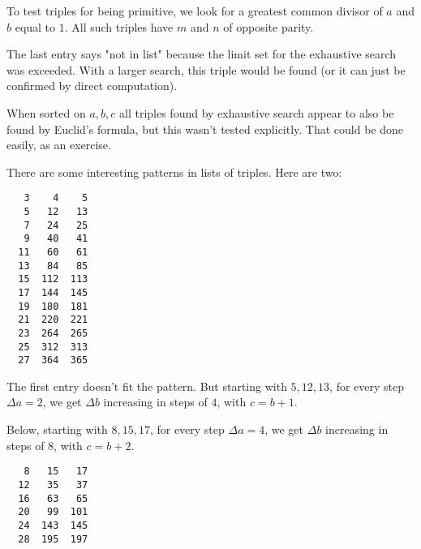 \documentclass[11pt, oneside]{article}
\begin{document}
To test triples for being primitive, we look for a greatest common divisor of $a$ and $b$ equal to $1$.  All such triples have $m$ and $n$ of opposite parity.

The last entry says "not in list" because the limit set for the exhaustive search was exceeded.  With a larger search, this triple would be found (or it can just be confirmed by direct computation).

When sorted on $a,b,c$ all triples found by exhaustive search appear to also be found by Euclid's formula, but this wasn't tested explicitly.  That could be done easily, as an exercise.

There are some interesting patterns in lists of triples.  Here are two:

\begin{verbatim}
   3    4    5 
   5   12   13 
   7   24   25 
   9   40   41 
  11   60   61 
  13   84   85 
  15  112  113 
  17  144  145 
  19  180  181 
  21  220  221 
  23  264  265 
  25  312  313 
  27  364  365 
\end{verbatim}

The first entry doesn't fit the pattern.  But starting with $5,12,13$, for every step $\Delta a = 2$, we get $\Delta b$ increasing in steps of $4$, with $c = b + 1$.

Below, starting with $8,15,17$, for every step $\Delta a = 4$, we get $\Delta b$ increasing in steps of $8$, with $c = b + 2$.

\begin{verbatim}
   8   15   17 
  12   35   37 
  16   63   65 
  20   99  101 
  24  143  145 
  28  195  197 
 \end{verbatim}
\end{document}
